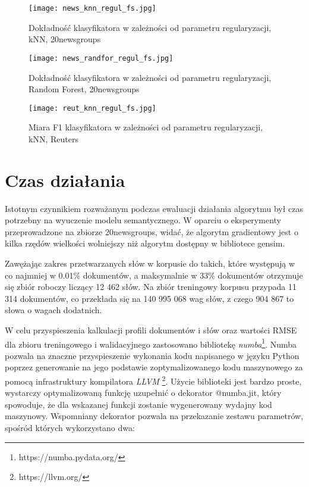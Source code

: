 \documentclass{pracamgr}
\begin{document}
\begin{figure}[]
  \texttt{[image: news\_knn\_regul\_fs.jpg]}
  \caption{Dokładność klasyfikatora w zależności od parametru regularyzacji, kNN, 20newsgroups}\label{fig:news_knn_regul_fs}
\endminipage\hfill
{}%
  \texttt{[image: news\_randfor\_regul\_fs.jpg]}
  \caption{Dokładność klasyfikatora w zależności od parametru regularyzacji, Random Forest, 20newsgroups}\label{fig:news_randfor_regul_fs}
\endminipage\hfill
\end{figure}
\begin{figure}[]
    \centering
    \texttt{[image: reut\_knn\_regul\_fs.jpg]}
    \caption{Miara F1 klasyfikatora w zależności od parametru regularyzacji, kNN, Reuters}
    \label{fig:reut_knn_regul_fs}
\end{figure}

\section{Czas działania}
Istotnym czynnikiem rozważanym podczas ewaluacji działania algorytmu był czas potrzebny na wyuczenie modelu semantycznego. W oparciu o eksperymenty przeprowadzone na zbiorze 20newsgroups, widać, że algorytm gradientowy jest o kilka rzędów wielkości wolniejszy niż algorytm dostępny w bibliotece gensim.

Zawężając zakres przetwarzanych słów w korpusie do takich, które występują w co najmniej w 0.01\% dokumentów, a maksymalnie w 33\% dokumentów otrzymuje się zbiór roboczy liczący 12 462 słów. Na zbiór treningowy korpusu przypada 11 314 dokumentów, co przekłada się na 140 995 068 wag słów, z czego 904 867 to słowa o wagach dodatnich.

W celu przyspieszenia kalkulacji profili dokumentów i słów oraz wartości RMSE dla zbioru treningowego i walidacyjnego zastosowano bibliotekę \textit{numba}\footnote{https://numba.pydata.org/}. Numba pozwala na znaczne przyspieszenie wykonania kodu napisanego w języku Python poprzez generowanie na jego podstawie zoptymalizowanego kodu maszynowego za pomocą infrastruktury kompilatora \textit{LLVM} \footnote{https://llvm.org/}. Użycie biblioteki jest bardzo proste, wystarczy optymalizowaną funkcję uzupełnić o dekorator @numba.jit, który spowoduje, że dla wskazanej funkcji zostanie wygenerowany wydajny kod maszynowy. Wspomniany dekorator pozwala na przekazanie zestawu parametrów, spośród których wykorzystano dwa:
\end{document}
